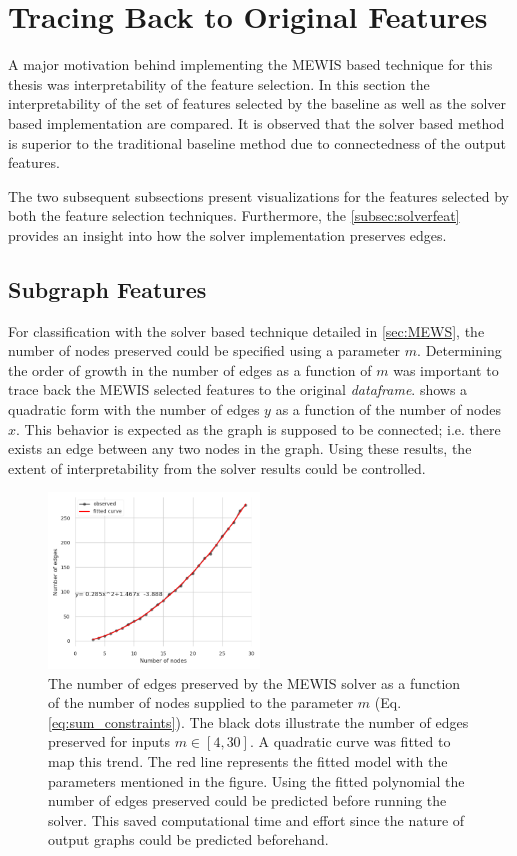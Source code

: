 \documentclass[msthesis.tex]{subfiles}
\begin{document}
\section{Tracing Back to Original Features}
A major motivation behind implementing the \gls{MEWIS} based technique for this thesis was interpretability of the feature selection. In this section the interpretability of the set of features selected by the baseline as well as the solver based implementation are compared. It is observed that the solver based method is superior to the traditional baseline method due to connectedness of the output features. 

The two subsequent subsections present visualizations for the features selected by both the feature selection techniques. Furthermore, the \autoref{subsec:solverfeat} provides an insight into how the solver implementation preserves edges. 
\subsection{Subgraph Features}
\label{subsec:solverfeat}
For classification with the solver based technique detailed in \autoref{sec:MEWS}, the number of nodes preserved could be specified using a parameter $m$. Determining the order of growth in the number of edges as a function of $m$ was important to trace back the MEWIS selected features to the original \textit{dataframe}.  shows a quadratic form with the number of edges $y$ as a function of the number of nodes $x$. This behavior is expected as the graph is supposed to be connected; i.e. there exists an edge between any two nodes in the graph. Using these results, the extent of interpretability from the solver results could be controlled. 
\begin{figure}
    \centering
    \includegraphics[height=0.5\textwidth,width=0.5\textwidth, keepaspectratio]{images/Gender_nodes_preserved.png}
    \caption{The number of edges preserved by the \gls{MEWIS} solver as a function of the number of nodes supplied to the  parameter $m$ (Eq. \ref{eq:sum_constraints}). The black dots illustrate the number of edges preserved for inputs  $m \in [4,30]$. A quadratic curve was fitted to map this trend. The red line represents the fitted model with the parameters mentioned in the figure. Using the fitted polynomial the number of edges preserved could be predicted before running the solver. This saved computational time and effort since the nature of output graphs could be predicted beforehand.}
    \label{fig:fun_num_edges}
\end{figure}
\end{document}
